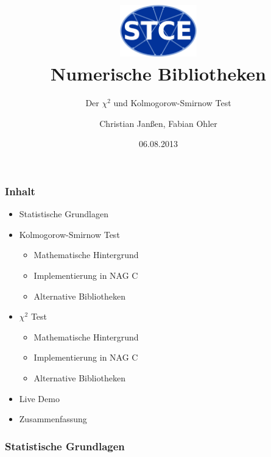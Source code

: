 \documentclass{beamer}
\begin{document}
\title{\centering
\includegraphics[width=0.25\textwidth]{./figures/logo.eps} \\ Numerische Bibliotheken}

\subtitle{Der $\chi^2$ und Kolmogorow-Smirnow Test}
\author{Christian Jan\ss en, Fabian Ohler}
\date{06.08.2013}
\frame[plain]{\titlepage}

\begin{frame}
\frametitle{Inhalt}
	\begin{itemize}
		\item Statistische Grundlagen
		\item Kolmogorow-Smirnow Test
		\begin{itemize}
			\item Mathematische Hintergrund
			\item Implementierung in NAG C
			\item Alternative Bibliotheken
		\end{itemize}
		\item $\chi^2$ Test
		\begin{itemize}
			\item Mathematische Hintergrund
			\item Implementierung in NAG C
			\item Alternative Bibliotheken
		\end{itemize}
		\item Live Demo
		\item Zusammenfassung
	\end{itemize}
\end{frame}

\begin{frame}
\frametitle{Statistische Grundlagen}
\end{frame}
\end{document}
